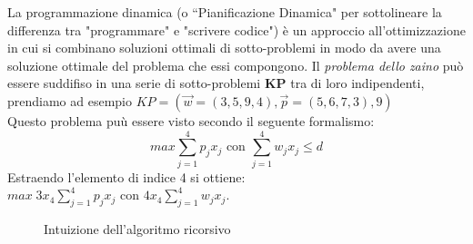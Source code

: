 \documentclass[a4paper]{article}
\begin{document}
La programmazione dinamica (o “Pianificazione Dinamica" per sottolineare la differenza tra "programmare" e "scrivere codice") è un approccio all’ottimizzazione in cui si combinano soluzioni ottimali di sotto-problemi in modo da avere una soluzione ottimale del problema che essi compongono.
Il \textit{problema dello zaino} può essere suddifiso in una serie di sotto-problemi \textbf{KP} tra di loro indipendenti, prendiamo ad esempio $KP = (\vec w = (3,5,9,4), \vec p = (5, 6, 7, 3),9)$\\
Questo problema puù essere visto secondo il seguente formalismo:$$ max \sum_{j=1}^4 p_jx_j \text{ con } \sum_{j=1}^4 w_jx_j \leq d$$
Estraendo l'elemento di indice 4 si ottiene: $ max\; 3x_4 \sum_{j=1}^4 p_jx_j \text{ con } 4x_4\sum_{j=1}^4 w_jx_j$.
\begin{figure}[!ht]
\centering
{}
\caption{Intuizione dell'algoritmo ricorsivo} \label{FIG:D1_intuizione}
\end{figure}\\
\end{document}
